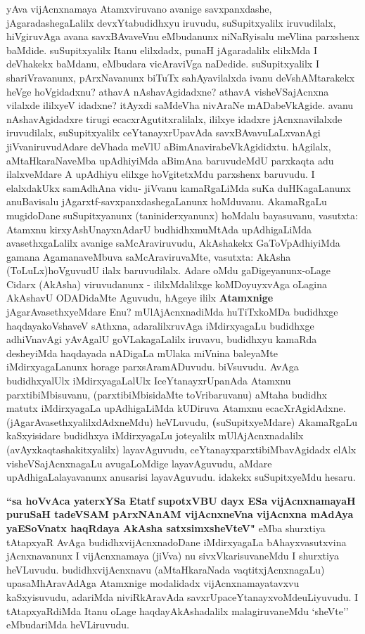 \begin{artha}
yAva vijAcnxnamaya Atamxviruvano avanige savxpanxdashe,
jAgaradashegaLalilx devxYtabudidhxyu iruvudu, suSupitxyalilx
iruvudilalx, hiVgiruvAga avana savxBAvaveVnu eMbudanunx niNaRyisalu
meVlina parxshenx baMdide. suSupitxyalilx Itanu elilxdadx, punaH
jAgaradalilx elilxMda I deVhakekx baMdanu, eMbudara vicAraviVga
naDedide. suSupitxyalilx I shariVravanunx, pArxNavanunx biTuTx
sahAyavilalxda ivanu deVshAMtarakekx heVge hoVgidadxnu? athavA
nAshavAgidadxne? athavA visheVSajAcnxna vilalxde ililxyeV idadxne?
itAyxdi saMdeVha nivAraNe mADabeVkAgide. avanu nAshavAgidadxre tirugi
ecacxrAgutitxralilalx, ililxye idadxre jAcnxnavilalxde iruvudilalx,
suSupitxyalilx ceYtanayxrUpavAda savxBAvavuLaLxvanAgi
jiVvaniruvudAdare deVhada meVlU aBimAnavirabeVkAgididxtu. hAgilalx,
aMtaHkaraNaveMba upAdhiyiMda aBimAna baruvudeMdU parxkaqta adu
ilalxveMdare  A upAdhiyu elilxge hoVgitetxMdu parxshenx
baruvudu. I elalxdakUkx samAdhAna vidu- jiVvanu kamaRgaLiMda
suKa duHKagaLanunx anuBavisalu jAgarxtf-savxpanxdashegaLanunx
hoMduvanu. AkamaRgaLu mugidoDane suSupitxyanunx (taniniderxyanunx)
hoMdalu bayasuvanu, vasutxta: Atamxnu kirxyAshUnayxnAdarU
budhidhxmuMtAda upAdhigaLiMda avasethxgaLalilx avanige
saMcAraviruvudu, AkAshakekx GaToVpAdhiyiMda gamana AgamanaveMbuva
saMcAraviruvaMte, vasutxta: AkAsha (ToLuLx)\break hoVguvudU ilalx
baruvudilalx. Adare oMdu gaDigeyanunx-oLage Cidarx (AkAsha) viruvudanunx -
ililxMdalilxge koMDoyuyxvAga oLagina  AkAshavU ODADidaMte Aguvudu, hAgeye
ililx \textbf{Atamxnige} jAgarAvasethxyeMdare Enu? mUlAjAcnxnadiMda
huTiTxkoMDa budidhxge haqdayakoVshaveV sAthxna, adaralilxruvAga
iMdirxyagaLu budidhxge adhiVnavAgi yAvAgalU goVLakagaLalilx iruvavu,
budidhxyu kamaRda desheyiMda haqdayada nADigaLa mUlaka miVnina
baleyaMte iMdirxyagaLanunx horage parxsAramADuvudu. biVsuvudu. AvAga
budidhxyalUlx iMdirxyagaLalUlx IceYtanayxrUpanAda Atamxnu
parxtibiMbisuvanu, (parxtibiMbisidaMte toVribaruvanu) aMtaha budidhx
matutx iMdirxyagaLa upAdhigaLiMda kUDiruva Atamxnu
ecacXrAgidAdxne. (jAgarAvasethxyalilxdAdxneMdu) heVLuvudu,
 \textbf(suSupitxyeMdare) AkamaRgaLu kaSxyisidare budidhxya
iMdirxyagaLu joteyalilx mUlAjAcnxnadalilx (avAyxkaqtashakitxyalilx)
layavAguvudu, ceYtanayxparxtibiMbavAgidadx elAlx visheVSajAcnxnagaLu
avugaLoMdige layavAguvudu, aMdare upAdhigaLalayavanunx
anusarisi layavAguvudu. idakekx suSupitxyeMdu hesaru.
\end{artha}

\begin{artha}
\textbf{``sa hoVvAca \mdash yaterxYSa Etatf supotxV\s BU dayx ESa vijAcnxnamayaH
puruSaH tadeVSAM pArxNAnAM vijAcnxneVna vijAcnxna mAdAya ya\break ESoV\s natx
haqRdaya AkAsha satxsimxsheVteV"} eMba shurxtiya tAtapxyaR  \mdash AvAga
budidhxvijAcnxnadoDane iMdirxyagaLa bAhayxvasutxvina jAcnxnavanunx I
vijAcnxnamaya (jiVva) nu sivxVkarisuvaneMdu I shurxtiya
heVLuvudu. budidhxvijAcnxnavu (aMtaHkaraNada vaqtitxjAcnxnagaLu)
upasaMhAravAdAga Atamxnige modalidadx
vijAcnxnamayatavxvu kaSxyisuvudu, adariMda niviRkAravAda
savxrUpaceYtanayxvoMde\break uLiyuvudu. I tAtapxyaRdiMda Itanu oLage
haqdayAkAshadalilx malagiruvaneMdu `sheVte'' eMbudariMda heVLiruvudu.
\end{artha}

